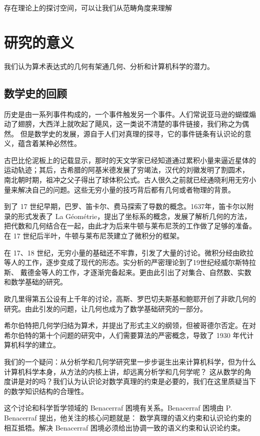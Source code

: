\documentclass[a4paper,12pt]{article}
\numberwithin{problem}{section}
\numberwithin{definition}{section}
\numberwithin{lemma}{section}
\numberwithin{proposition}{section}
\numberwithin{theorem}{section}
\numberwithin{grammar}{section}
\numberwithin{program}{section}
\numberwithin{convention}{section}
\numberwithin{corollary}{section}
\begin{document}
存在理论上的探讨空间，可以让我们从范畴角度来理解

\newpage

\section{研究的意义}

我们认为算术表达式的几何有架通几何、分析和计算机科学的潜力。

\subsection{数学史的回顾}

历史是由一系列事件构成的，一个事件触发另一个事件。人们常说亚马逊的蝴蝶煽动了翅膀，大西洋上就吹起了飓风，这一类说不清楚的事件链接，我们称之为偶然。
但是数学史的发展，源自于人们对真理的探寻，它的事件链条有认识论的意义，蕴含着某种必然性。

古巴比伦泥板上的记载显示，那时的天文学家已经知道通过累积小量来逼近星体的运动轨迹；其后，古希腊的阿基米德发展了穷竭法，汉代的刘徽发明了割圆术，
南北朝时期，祖冲之父子得出了球体积公式。古人很久之前就已经通晓利用无穷小量来解决自己的问题。这些无穷小量的技巧背后都有几何或者物理的背景。

到了 17 世纪早期，巴罗、笛卡尔、费马探索了导数的概念。1637年，笛卡尔以附录的形式发表了 La Géométrie，提出了坐标系的概念，发展了解析几何的方法，
把代数和几何结合在一起，由此才为后来牛顿与莱布尼茨的工作做了足够的准备。在 17 世纪后半叶，牛顿与莱布尼茨建立了微积分的框架。

在 17、18 世纪，无穷小量的基础还不牢靠，引发了大量的讨论。微积分经由欧拉等人的工作，逐步变成了现代的形态。实分析的严密理论到了19世纪经威尔斯特拉斯、
戴德金等人的工作，才逐渐完备起来。更由此引出了对集合、自然数、实数和数学基础的研究。

欧几里得第五公设有上千年的讨论，高斯、罗巴切夫斯基和鲍耶开创了非欧几何的研究。由此引发的问题，让几何也成为了数学基础研究的一部分。

希尔伯特把几何学归结为算术，并提出了形式主义的纲领，但被哥德尔否定。在对希尔伯特的第十个问题的研究中，人们需要算法的严密概念，导致了 1930 年代计算机科学的建立。

我们的一个疑问：从分析学和几何学研究里一步步诞生出来计算机科学，但为什么计算机科学本身，从方法的内核上讲，却远离分析学和几何学呢？
这从数学的角度讲是对的吗？我们认为认识论对数学真理的约束是必要的，我们在这里质疑当下的数学知识结构的合理性。

这个讨论和科学哲学领域的 Benacerraf 困境有关系。Benacerraf 困境由 P. Benacerraf 提出，他关注的核心问题就是：
数学真理的语义约束和认识论约束的相互抵牾。解决 Benacerraf 困境必须给出协调一致的语义约束和认识论约束。
\end{document}
